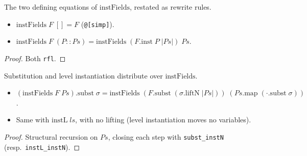 \begin{lemma}
  \label{fam:proj-instfields-simp}
  \leanok

   The two defining equations of $\mathrm{instFields}$, restated as rewrite rules.
  \begin{itemize}
  \item $\mathrm{instFields}\;F\;[]=F$ (\texttt{@[simp]}).
  \item $\mathrm{instFields}\;F\;(P::Ps)=\mathrm{instFields}\;(F.\mathrm{inst}\;P\;|Ps|)\;Ps$.
  \end{itemize}
\end{lemma}
\begin{proof}
  \leanok
   Both \texttt{rfl}.
\end{proof}

\begin{lemma}
  \label{fam:proj-instfields-subst}
  \leanok

   Substitution and level instantiation distribute over $\mathrm{instFields}$.
  \begin{itemize}
  \item $(\mathrm{instFields}\;F\;Ps).\mathrm{subst}\;\sigma = \mathrm{instFields}\;
        (F.\mathrm{subst}\;(\sigma.\mathrm{liftN}\;|Ps|))\;(Ps.\mathrm{map}\;(\cdot.\mathrm{subst}\;
        \sigma))$.
  \item Same with $\mathrm{instL}\;ls$, with no lifting (level instantiation moves no variables).
  \end{itemize}
\end{lemma}
\begin{proof}
  \leanok
   Structural recursion on $Ps$, closing each step with \texttt{subst\_instN}
  (resp.\ \texttt{instL\_instN}).
\end{proof}

